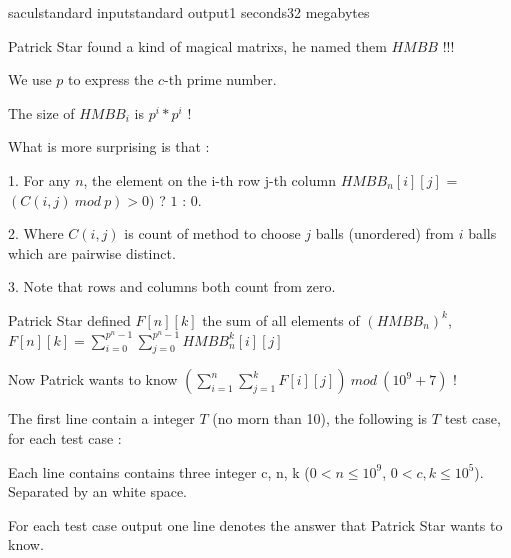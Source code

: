\begin{problem}{sacul}{standard input}{standard output}{1 seconds}{32 megabytes}

Patrick Star found a kind of magical matrixs, he named them $HMBB$ !!!

We use $p$ to express the $c$-th prime number. 

The size of $HMBB_i$ is $p^i * p^i$ ! 

What is more surprising is that :

1. For any $n$, the element on the i-th row j-th column $HMBB_n[i][j]$ = $(C(i, j)\ mod\ p) > 0)$ ? $1$ : $0$. 

2. Where $C(i, j)$ is count of method to choose $j$ balls (unordered) from $i$ balls which are pairwise distinct.

3. Note that rows and columns both count from zero.


Patrick Star defined $F[n][k]$ the sum of all elements of $(HMBB_n)^k$, $F[n][k] = \sum_{i = 0}^{p^n-1}\sum_{j=0}^{p^n-1}HMBB_n^k[i][j]$

Now Patrick wants to know $(\sum_{i=1}^n\sum_{j=1}^kF[i][j])\ mod\ (10^9 + 7)$ !

\InputFile
The first line contain a integer $T$ (no morn than 10), the following is $T$ test case, for each test case :

Each line contains contains three integer c, n, k ($0 < n \le 10^9$, $0 < c, k \le 10^5$). Separated by an white space.

\OutputFile
For each test case output one line denotes the answer that Patrick Star wants to know.


\Example

\begin{example}
%
\end{example}

\end{problem}

